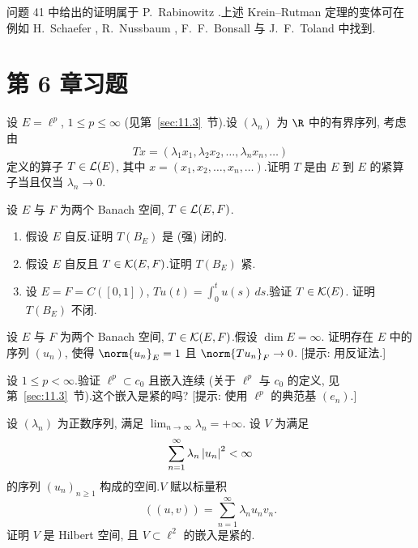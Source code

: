 问题 41 中给出的证明属于 P.~Rabinowitz .上述
Krein--Rutman 定理的变体可在例如 H.~Schaefer , R.~Nussbaum , F.~F.~Bonsall  与
J.~F.~Toland  中找到.

\section*{第 6 章习题}

\begin{exercise}
\label{exer:6.1}
设 $E=\ell^p$, $1\le p\le\infty$ (见第~\ref{sec:11.3}~节).设 $(\lambda_n)$ 为 $\R$
中的有界序列, 考虑由
\begin{equation*}
Tx=(\lambda_1x_1,\lambda_2x_2,\dots,\lambda_nx_n,\dots)
\end{equation*}
定义的算子 $T\in\mathcal{L}(E)$, 其中 $x=(x_1,x_2,\dots,x_n,\dots)$.证明 $T$ 是由
$E$ 到 $E$ 的紧算子当且仅当 $\lambda_n\to0$.
\end{exercise}

\begin{exercise}
\label{exer:6.2}
设 $E$ 与 $F$ 为两个 Banach 空间, $T\in\mathcal{L}(E,F)$.
\begin{enumerate}[label=\arabic*., leftmargin=2.2em, itemsep=0.3em]
	\item 假设 $E$ 自反.证明 $T(B_E)$ 是 (强) 闭的.
	\item 假设 $E$ 自反且 $T\in\mathcal{K}(E,F)$.证明 $T(B_E)$ 紧.
	\item 设 $E=F=C([0,1])$, $Tu(t)=\int_0^tu(s)\,ds$.验证 $T\in\mathcal{K}(E)$.
	      证明 $T(B_E)$ 不闭.
\end{enumerate}
\end{exercise}

\begin{exercise}
\label{exer:6.3}
设 $E$ 与 $F$ 为两个 Banach 空间, $T\in\mathcal{K}(E,F)$.假设 $\dim E=\infty$.
证明存在 $E$ 中的序列 $(u_n)$, 使得 $\norm{u_n}_E=1$ 且
$\norm{Tu_n}_F\to0$.
[提示: 用反证法.]
\end{exercise}

\begin{exercise}
\label{exer:6.4}
设 $1\le p<\infty$.验证 $\ell^p\subset c_0$ 且嵌入连续 (关于 $\ell^p$ 与
$c_0$ 的定义, 见第~\ref{sec:11.3}~节).这个嵌入是紧的吗?
[提示: 使用 $\ell^p$ 的典范基 $(e_n)$.]
\end{exercise}

\begin{exercise}
\label{exer:6.5}
设 $(\lambda_n)$ 为正数序列, 满足 $\lim_{n\to\infty}\lambda_n=+\infty$.
设 $V$ 为满足
\begin{equation*}
\sum_{n=1}^\infty\lambda_n\left|u_n\right|^2<\infty
\end{equation*}
的序列 $(u_n)_{n\ge1}$ 构成的空间.$V$ 赋以标量积
\begin{equation*}
((u,v))=\sum_{n=1}^\infty\lambda_nu_nv_n.
\end{equation*}
证明 $V$ 是 Hilbert 空间, 且 $V\subset\ell^2$ 的嵌入是紧的.
\end{exercise}

